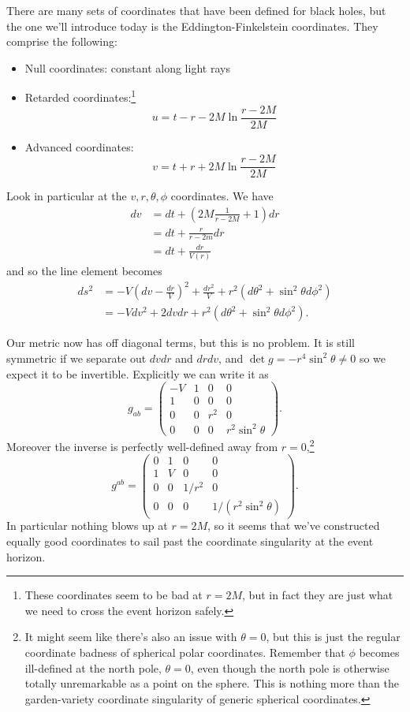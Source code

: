 There are many sets of coordinates that have been defined for black holes, but the one we'll introduce today is the Eddington-Finkelstein coordinates. They comprise the following:
\begin{itemize}
    \item Null coordinates: constant along light rays
    \item Retarded coordinates:\footnote{These coordinates seem to be bad at $r=2M$, but in fact they are just what we need to cross the event horizon safely.} $$u=t-r-2M \ln \frac{r-2M}{2M}$$
    \item Advanced coordinates: $$v=t+r+2M\ln \frac{r-2M}{2M}$$
\end{itemize}
Look in particular at the $v,r,\theta,\phi$ coordinates. We have
\begin{align*}
    dv &= dt+(2M\frac{1}{r-2M}+1)dr\\
    &= dt+\frac{r}{r-2m}dr\\
    &= dt+\frac{dr}{V(r)}
\end{align*}
and so the line element becomes
\begin{align*}
    ds^2&= -V(dv -\frac{dr}{V})^2+\frac{dr^2}{V}+r^2(d\theta^2 +\sin^2\theta d\phi^2)\\
    &=-Vdv^2 +2dvdr+r^2(d\theta^2 +\sin^2\theta d\phi^2).
\end{align*}

Our metric now has off diagonal terms, but this is no problem. It is still symmetric if we separate out $dvdr$ and $drdv$, and $\det g =-r^4\sin^2\theta \neq 0$ so we expect it to be invertible. Explicitly we can write it as
$$
g_{ab}=\begin{pmatrix}
    -V & 1 & 0 & 0\\
    1 & 0 & 0 & 0\\
    0&0&r^2&0\\
    0&0&0&r^2\sin^2\theta
\end{pmatrix}.
$$
Moreover the inverse is perfectly well-defined away from $r=0$,\footnote{It might seem like there's also an issue with $\theta=0$, but this is just the regular coordinate badness of spherical polar coordinates. Remember that $\phi$ becomes ill-defined at the north pole, $\theta=0$, even though the north pole is otherwise totally unremarkable as a point on the sphere. This is nothing more than the garden-variety coordinate singularity of generic spherical coordinates.}
$$
g^{ab}=\begin{pmatrix}
    0 & 1 & 0 & 0\\
    1 & V & 0 & 0\\
    0 & 0 & 1/r^2 &0\\
    0 & 0 & 0 & 1/(r^2\sin^2\theta)
\end{pmatrix}.
$$
In particular nothing blows up at $r=2M$, so it seems that we've constructed equally good coordinates to sail past the coordinate singularity at the event horizon.

